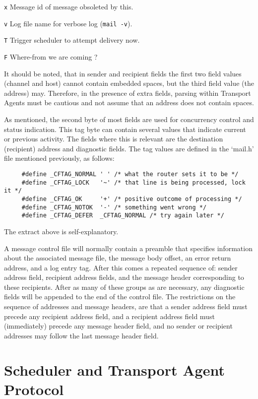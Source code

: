 {\tt x}
Message id of message obsoleted by this.

{\tt v}
Log file name for verbose log ({\tt mail -v}).

{\tt T}
Trigger scheduler to attempt delivery now.

{\tt F}
Where-from we are coming ?               

It should be noted, that in sender and recipient fields the first two field
values (channel and host) cannot contain embedded spaces, but the third
field value (the address) may.  Therefore, in the presence of extra fields,
parsing within Transport Agents must be cautious and not assume that an
address does not contain spaces.

As mentioned, the second byte of most fields are used for concurrency
control and status indication.  This tag byte can contain several values
that indicate current or previous activity.  The fields where this is
relevant are the destination (recipient) address and diagnostic fields.
The tag values are defined in the `mail.h' file mentioned previously, as
follows:
\begin{verbatim}
     #define _CFTAG_NORMAL ' ' /* what the router sets it to be */
     #define _CFTAG_LOCK   '~' /* that line is being processed, lock it */
     #define _CFTAG_OK     '+' /* positive outcome of processing */
     #define _CFTAG_NOTOK  '-' /* something went wrong */
     #define _CFTAG_DEFER  _CFTAG_NORMAL /* try again later */
\end{verbatim}

The extract above is self-explanatory.

A message control file will normally contain a preamble that specifies
information about the associated message file, the message body offset, an
error return address, and a log entry tag.  After this comes a repeated
sequence of: sender address field, recipient address fields, and the
message header corresponding to these recipients.  After as many of these
groups as are necessary, any diagnostic fields will be appended to the end
of the control file.  The restrictions on the sequence of addresses and
message headers, are that a sender address field must precede any recipient
address field, and a recipient address field must (immediately) precede any
message header field, and no sender or recipient addresses may follow the
last message header field.






\section{Scheduler and Transport Agent Protocol}



